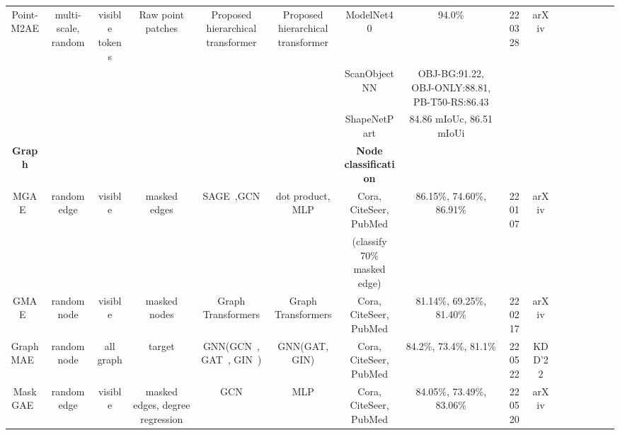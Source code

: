 \documentclass[10pt,journal,compsoc]{IEEEtran}
\begin{document}
\begin{table}[htb]
{\begin{tabular}{cccccccccccccccc}
\hline %
Point-M2AE~\cite{zhang2022point} & multi-scale, random & visible tokens & Raw point patches &  Proposed hierarchical transformer & Proposed hierarchical transformer & ModelNet40 & 94.0\% & 220328 & arXiv\\ 
& & & & & & ScanObjectNN & OBJ-BG:91.22, OBJ-ONLY:88.81, PB-T50-RS:86.43 & & \\ 
& & & & & & ShapeNetPart & 84.86 mIoUc, 86.51 mIoUi  & & \\ 
\hline
\textbf{Graph}& & & & & & \textbf{Node classification} & & & \\ 
\hline
MGAE~\cite{tan2022mgae} & random edge & visible & masked edges &  SAGE~\cite{hamilton2017graphsage},GCN~\cite{kipf2017gcn} & dot product, MLP & Cora, CiteSeer, PubMed & 86.15\%, 74.60\%, 86.91\% & 220107 & arXiv\\
& & & & & & (classify 70\% masked edge) & & & \\
\hline
GMAE~\cite{chen2022graph} & random node & visible & masked nodes & Graph Transformers & Graph Transformers & Cora, CiteSeer, PubMed & 81.14\%, 69.25\%, 81.40\% & 220217 & arXiv\\
\hline
GraphMAE~\cite{hou2022graphmae} & random node & all graph & target & GNN(GCN~\cite{kipf2017gcn}, GAT~\cite{velivckovic2017gan}, GIN~\cite{xu2018gin}) & GNN(GAT, GIN) & Cora, CiteSeer, PubMed & 84.2\%, 73.4\%, 81.1\% & 220522 & KDD'22\\
\hline
MaskGAE~\cite{li2022maskgae} & random edge & visible & masked edges, degree regression & GCN & MLP & Cora, CiteSeer, PubMed & 84.05\%, 73.49\%, 83.06\% & 220520 & arXiv\\
\hline
\end{tabular}}
\end{table}
\end{document}
